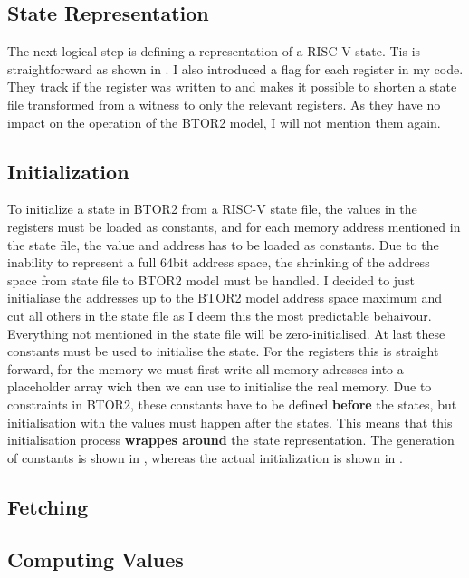 \subsection{State Representation}
The next logical step is defining a representation of a RISC-V state. Tis is straightforward as shown in .
I also introduced a flag for each register in my code. They track if the register was written to and makes it possible to shorten a state file transformed from a witness to only the relevant registers. As they have no impact on the operation of the BTOR2 model, I will not mention them again.


\subsection{Initialization}
To initialize a state in BTOR2 from a RISC-V state file, the values in the registers must be loaded as constants, and for each memory address mentioned in the state file, the value and address has to be loaded as constants.
Due to the inability to represent a full 64bit address space, the shrinking of the address space from state file to BTOR2 model must be handled. I decided to just initialiase the addresses up to the BTOR2 model address space maximum and cut all others in the state file as I deem this the most predictable behaivour.
Everything not mentioned in the state file will be zero-initialised.
At last these constants must be used to initialise the state. For the registers this is straight forward, for the memory we must first write all memory adresses into a placeholder array wich then we can use to initialise the real memory.
Due to constraints in BTOR2, these constants have to be defined \textbf{before} the states, but initialisation with the values must happen after the states. This means that this initialisation process \textbf{wrappes around} the state representation.
The generation of constants is shown in , whereas the actual initialization is shown in .


\subsection{Fetching}
\subsection{Computing Values}
